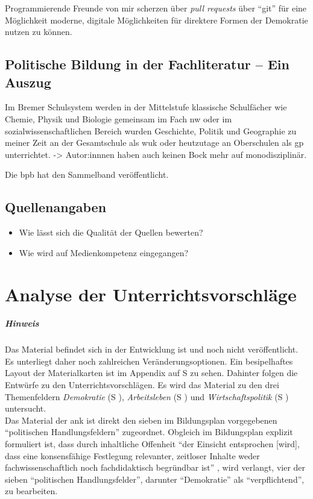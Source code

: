 Programmierende Freunde von mir scherzen über \emph{pull requests} über \enquote{git} für eine Möglichkeit moderne, digitale Möglichkeiten für direktere Formen der Demokratie nutzen zu können.





\subsection{Politische Bildung in der Fachliteratur -- Ein Auszug}
Im Bremer Schulsystem werden in der Mittelstufe klassische Schulfächer wie Chemie, Physik und Biologie gemeinsam im Fach \gls{nw} \autocite{vogel2010nw} oder im sozialwissenschaftlichen Bereich wurden Geschichte, Politik und Geographie zu meiner Zeit an der Gesamtschule als \gls{wuk} \autocite{vogel2006gs} oder heutzutage an Oberschulen als \gls{gp} \autocite{vogel2010gp} unterrichtet.
->
Autor:innnen haben auch keinen Bock mehr auf monodisziplinär. 

Die \gls{bpb} hat den Sammelband veröffentlicht.
\subsection{Quellenangaben}
\begin{itemize}
    \item Wie lässt sich die Qualität der Quellen bewerten?
    \item Wie wird auf Medienkompetenz eingegangen?
 \end{itemize}




\section{Analyse der Unterrichtsvorschläge}
\subparagraph{Hinweis}
Das Material befindet sich in der Entwicklung ist und noch nicht veröffentlicht. Es unterliegt daher noch zahlreichen Veränderungsoptionen. 
Ein besipelhaftes Layout der Materialkarten ist im Appendix auf \acrlong{S} \pageref{ANKPrototyp} zu sehen. Dahinter folgen die Entwürfe zu den Unterrichtsvorschlägen.
Es wird das Material zu den drei Themenfeldern \emph{Demokratie} (\gls{S} \pageref{DEMOKRATIE-A1}), \emph{Arbeitsleben} (\gls{S} \pageref{ARBEITSLEBEN-A1}) und \emph{Wirtschaftspolitik} (\gls{S} \pageref{WIRTSCHAFTSPOLITIK-A1}) untersucht. \\


Das Material der \gls{ank} ist direkt den sieben im Bildungsplan vorgegebenen \enquote{politischen Handlungsfeldern} \autocite[3, 15]{bplan} zugeordnet.
Obgleich im Bildungsplan explizit formuliert ist, dass durch inhaltliche Offenheit \enquote{der Einsicht entsprochen [wird], dass eine konsensfähige Festlegung relevanter, zeitloser Inhalte weder fachwissenschaftlich noch fachdidaktisch begründbar ist} \autocite[15]{bplan}, wird verlangt, vier der sieben \enquote{politischen Handlungsfelder}, darunter \enquote{Demokratie} als \enquote{verpflichtend}, zu bearbeiten.

